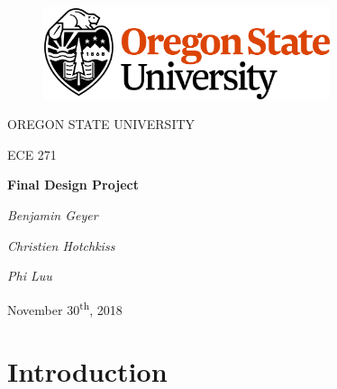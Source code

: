 \documentclass[12pt]{article}
\numberwithin{figure}{subsection}
\begin{document}
\begin{titlepage}
  \begin{center} \LARGE
    \begin{figure}[ht]
      \centering
      \includegraphics[width=0.75\textwidth]{osu_logo.png}
    \end{figure}

    \textsc{O{\Large REGON} S{\Large TATE} U{\Large NIVERSITY}}

    \textsc{ECE 271}

    \vspace{1in}

    \textbf{Final Design Project}

    \vspace{1in}

    \textit{Benjamin Geyer}

    \textit{Christien Hotchkiss}

    \textit{Phi Luu}

    \vfill

    November 30\textsuperscript{th}, 2018
  \end{center}
\end{titlepage}

\tableofcontents \newpage {}

\section{Introduction}
\end{document}
